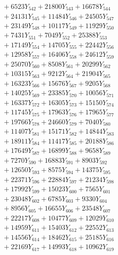\documentclass[a4paper,10pt]{article}
\begin{document}
{\begin{align}
&\;  + 6523 Y_{542} + 21800 Y_{543} + 16678 Y_{544} \\[0.3ex]
&\;  + 24131 Y_{545} + 11484 Y_{546} + 24505 Y_{547} \\[0.3ex]
&\;  + 23149 Y_{548} + 10117 Y_{549} + 11929 Y_{550} \\[0.3ex]
&\;  + 7431 Y_{551} + 7049 Y_{552} + 25388 Y_{553} \\[0.3ex]
&\;  + 17149 Y_{554} + 14705 Y_{555} + 22442 Y_{556} \\[0.3ex]
&\;  + 12958 Y_{557} + 16406 Y_{558} + 24612 Y_{559} \\[0.3ex]
&\;  + 25070 Y_{560} + 8508 Y_{561} + 20299 Y_{562} \\[0.3ex]
&\;  + 10315 Y_{563} + 9212 Y_{564} + 21904 Y_{565} \\[0.3ex]
&\;  + 16323 Y_{566} + 15676 Y_{567} + 9205 Y_{568} \\[0.5ex]\allowbreak
&\;  + 14025 Y_{569} + 23385 Y_{570} + 10056 Y_{571} \\[0.3ex]
&\;  + 16337 Y_{572} + 16305 Y_{573} + 15150 Y_{574} \\[0.3ex]
&\;  + 11745 Y_{575} + 17963 Y_{576} + 17965 Y_{577} \\[0.3ex]
&\;  + 19766 Y_{578} + 24660 Y_{579} + 7040 Y_{580} \\[0.3ex]
&\;  + 11407 Y_{581} + 15171 Y_{582} + 14844 Y_{583} \\[0.3ex]
&\;  + 18911 Y_{584} + 11417 Y_{585} + 20188 Y_{586} \\[0.3ex]
&\;  + 17649 Y_{587} + 16899 Y_{588} + 9658 Y_{589} \\[0.3ex]
&\;  + 7270 Y_{590} + 16883 Y_{591} + 8903 Y_{592} \\[0.3ex]
&\;  + 12650 Y_{593} + 8575 Y_{594} + 14375 Y_{595} \\[0.3ex]
&\;  + 22371 Y_{596} + 22884 Y_{597} + 21234 Y_{598} \\[0.5ex]\allowbreak
&\;  + 17992 Y_{599} + 15023 Y_{600} + 7565 Y_{601} \\[0.3ex]
&\;  + 23048 Y_{602} + 6785 Y_{603} + 9330 Y_{604} \\[0.3ex]
&\;  + 8956 Y_{605} + 16655 Y_{606} + 23548 Y_{607} \\[0.3ex]
&\;  + 22217 Y_{608} + 10477 Y_{609} + 12029 Y_{610} \\[0.3ex]
&\;  + 14959 Y_{611} + 15403 Y_{612} + 22552 Y_{613} \\[0.3ex]
&\;  + 14556 Y_{614} + 18462 Y_{615} + 25185 Y_{616} \\[0.3ex]
&\;  + 22169 Y_{617} + 14993 Y_{618} + 10962 Y_{619} \\[0.3ex]

\end{align}}
\end{document}
